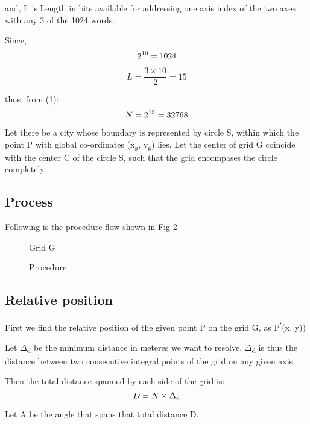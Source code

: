 \documentclass[conference]{IEEEtran}
\begin{document}
and, L is Length in bits available for addressing one axis index of the two axes with any 3 of the 1024 words.

Since, \begin{equation}2\textsuperscript{10}  = 1024\end{equation}

\begin{equation}L = \frac {3 \times 10} {2} = 15 \end{equation}

thus, from (1):
\begin{equation}N = 2\textsuperscript{15} = 32768 \end{equation}

Let there be a city whose boundary is represented by circle S, within which the point P with global co-ordinates (x\textsubscript{g}, y\textsubscript{g}) lies. Let the center of grid G coincide with the center C of the circle S, such that the grid encompases the circle completely.

\subsection{Process} Following is the procedure flow shown in Fig 2

\begin{figure}[!h]
\centerline{}
\caption{Grid G}
\label{Grid}
\end{figure}

\begin{figure}[!h]
\centerline{}
\caption{Procedure}
\label{Procedure}
\end{figure}

\subsection{Relative position} First we find the relative position of the given point P on the grid G, as P\textsuperscript{`}(x, y))

Let $\Delta$\textsubscript{d} be the minimum distance in meteres we want to resolve.
$\Delta$\textsubscript{d} is thus the distance between two consecutive integral points of the grid on any given axis.

Then the total distance spanned by each side of the grid is:
\begin{equation}D = N \times \Delta\textsubscript{d}\end{equation}

Let A be the angle that spans that total distance D.
\end{document}
